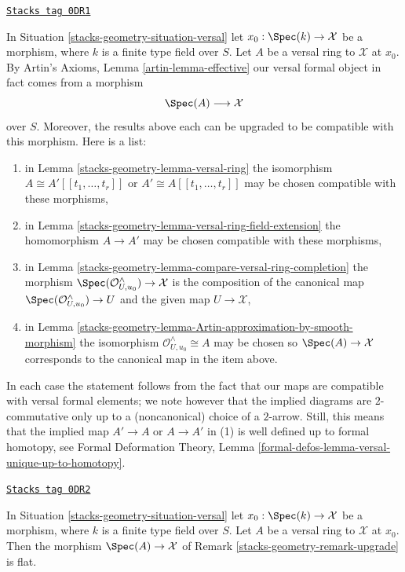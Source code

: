\begin{remark}

\label{stacks-geometry-remark-upgrade}
\href{https://stacks.math.columbia.edu/tag/0DR1}{\texttt{Stacks tag 0DR1}}

In Situation \ref{stacks-geometry-situation-versal} let $x_0 : \Spec(k) \to \mathcal{X}$
be a morphism, where $k$ is a finite type field over $S$.
Let $A$ be a versal ring to $\mathcal{X}$ at $x_0$. By Artin's Axioms,
Lemma \ref{artin-lemma-effective} our versal formal object
in fact comes from a morphism
$$
\Spec(A) \longrightarrow \mathcal{X}
$$
over $S$. Moreover, the results above each can be upgraded to be compatible
with this morphism. Here is a list:
\begin{enumerate}
\item in Lemma \ref{stacks-geometry-lemma-versal-ring} the isomorphism
$A \cong A'[[t_1, \ldots, t_r]]$ or $A' \cong A[[t_1, \ldots, t_r]]$
may be chosen compatible with these morphisms,
\item in Lemma \ref{stacks-geometry-lemma-versal-ring-field-extension} the
homomorphism $A \to A'$ may be chosen compatible with these morphisms,
\item in Lemma \ref{stacks-geometry-lemma-compare-versal-ring-completion}
the morphism $\Spec(\mathcal{O}_{U, u_0}^\wedge) \to \mathcal{X}$
is the composition of the canonical map
$\Spec(\mathcal{O}_{U, u_0}^\wedge) \to U$ and the given map
$U \to \mathcal{X}$,
\item in Lemma \ref{stacks-geometry-lemma-Artin-approximation-by-smooth-morphism}
the isomorphism $\mathcal{O}_{U, u_0}^\wedge \cong A$ may
be chosen so $\Spec(A) \to \mathcal{X}$ corresponds to the canonical map
in the item above.
\end{enumerate}
In each case the statement follows from the fact that our maps are
compatible with versal formal elements; we note however that the
implied diagrams are $2$-commutative only up to a (noncanonical)
choice of a $2$-arrow. Still, this means that the implied map $A' \to A$
or $A \to A'$ in (1) is well defined up to formal homotopy, see
Formal Deformation Theory, Lemma
\ref{formal-defos-lemma-versal-unique-up-to-homotopy}.
\end{remark}

\begin{lemma}
\label{stacks-geometry-lemma-versal-ring-flat}
\href{https://stacks.math.columbia.edu/tag/0DR2}{\texttt{Stacks tag 0DR2}}

In Situation \ref{stacks-geometry-situation-versal} let $x_0 : \Spec(k) \to \mathcal{X}$
be a morphism, where $k$ is a finite type field over $S$.
Let $A$ be a versal ring to $\mathcal{X}$ at $x_0$.
Then the morphism $\Spec(A) \to \mathcal{X}$ of
Remark \ref{stacks-geometry-remark-upgrade} is flat.
\end{lemma}

